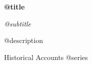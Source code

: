 \hypersetup{pageanchor=false}
\begin{titlepage}
\thispagestyle{empty}
\centering
\vspace*{0.11\textheight}
{\Huge\bfseries @{title}\par}
\vspace{0.45em}
{\Large\itshape @{subtitle}\par}
\vspace{0.85em}
{\large @{description}\par}
\vfill
{\small Historical Accounts \textbullet{} @{series}\par}
\vfill
\end{titlepage}
